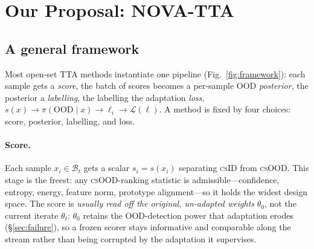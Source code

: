 \documentclass[11pt]{article}
\newcommand{\csid}{\textsc{cs}ID}
\newcommand{\csood}{\textsc{cs}OOD}
\newcommand{\method}[1]{\textsc{#1}}
\begin{document}
\newpage
\section{Our Proposal: \method{NOVA-TTA}}\label{sec:nova-tta}

\subsection{A general framework}\label{sec:framework}

Most open-set TTA methods instantiate one pipeline
(Fig.~\ref{fig:framework}): each sample gets a \emph{score}, the batch of
scores becomes a per-sample OOD \emph{posterior}, the posterior a
\emph{labelling}, the labelling the adaptation \emph{loss},
$s(x)\to\pi(\mathrm{OOD}\mid x)\to\ell_i\to\mathcal{L}(\ell)$. A method is
fixed by four choices: score, posterior, labelling, and loss.

\begin{center}
\label{fig:framework}
\end{center}

\paragraph{Score.} Each sample $x_i\in\mathcal{B}_t$ gets a scalar
$s_i=s(x_i)$ separating \csid{} from \csood. This stage is the freest: any
\csood-ranking statistic is admissible---confidence, entropy, energy,
feature norm, prototype alignment---so it holds the widest design space. The
score is \emph{usually read off the original, un-adapted weights} $\theta_0$,
not the current iterate $\theta_t$: $\theta_0$ retains the OOD-detection
power that adaptation erodes (\S\ref{sec:failure}), so a frozen scorer stays
informative and comparable along the stream rather than being corrupted by
the adaptation it supervises.
\end{document}
